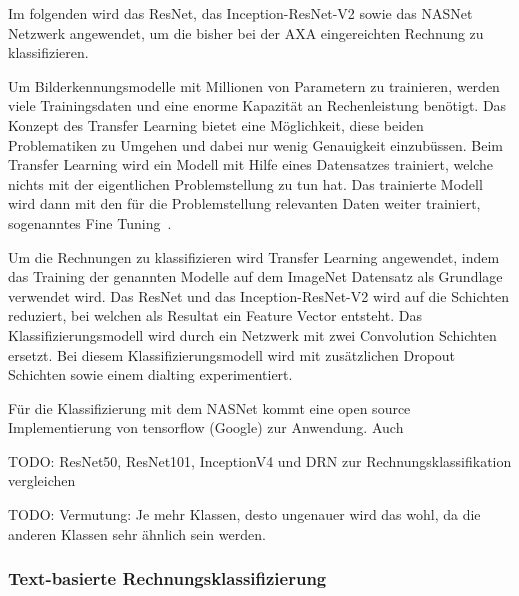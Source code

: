 




Im folgenden wird das ResNet, das Inception-ResNet-V2 sowie das NASNet Netzwerk angewendet, um die bisher bei der AXA eingereichten Rechnung zu klassifizieren.

Um Bilderkennungsmodelle mit Millionen von Parametern zu trainieren, werden viele Trainingsdaten und eine enorme Kapazität an Rechenleistung benötigt. Das Konzept des Transfer Learning bietet eine Möglichkeit, diese beiden Problematiken zu Umgehen und dabei nur wenig Genauigkeit einzubüssen. Beim Transfer Learning wird ein Modell mit Hilfe eines Datensatzes trainiert, welche nichts mit der eigentlichen Problemstellung zu tun hat. Das trainierte Modell wird dann mit den für die Problemstellung relevanten Daten weiter trainiert, sogenanntes Fine Tuning~\autocite{TensorflowImageRetraining, TDSTransferLearning}.

Um die Rechnungen zu klassifizieren wird Transfer Learning angewendet, indem das Training der genannten Modelle auf dem ImageNet Datensatz als Grundlage verwendet wird. 
Das ResNet und das Inception-ResNet-V2 wird auf die Schichten reduziert, bei welchen als Resultat ein Feature Vector entsteht. Das Klassifizierungsmodell wird durch ein Netzwerk mit zwei Convolution Schichten ersetzt. Bei diesem Klassifizierungsmodell wird mit zusätzlichen Dropout Schichten sowie einem dialting experimentiert.


Für die Klassifizierung mit dem NASNet kommt eine open source Implementierung von tensorflow (Google) zur Anwendung. Auch 

TODO: ResNet50, ResNet101, InceptionV4 und DRN zur Rechnungsklassifikation vergleichen


TODO: Vermutung: Je mehr Klassen, desto ungenauer wird das wohl, da die anderen Klassen sehr ähnlich sein werden.

\subsubsection{Text-basierte Rechnungsklassifizierung}
\label{chap:text-based-classification}

